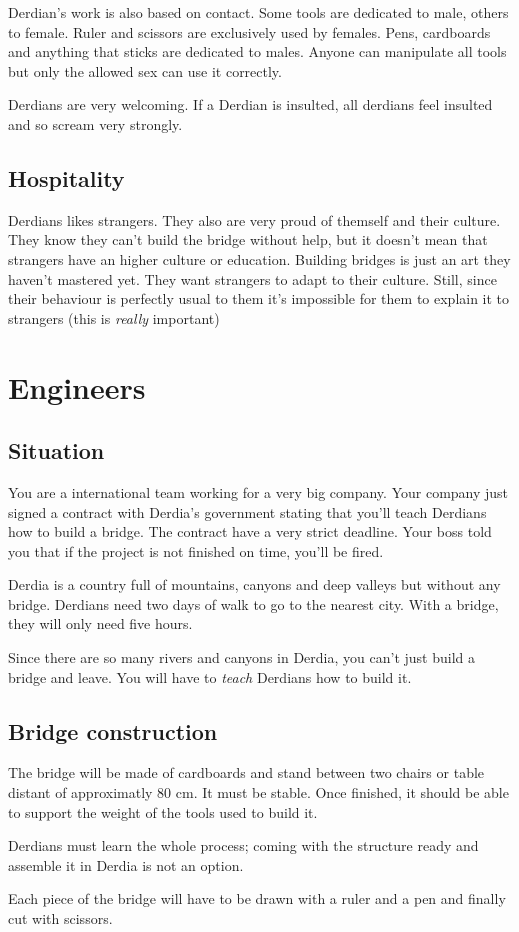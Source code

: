 \documentclass[11pt,a4paper]{article}
\newcounter{derdians}
\begin{document}
{Derdian's work is also based on contact.
Some tools are dedicated to male, others to female.
Ruler and scissors are exclusively used by females. Pens, cardboards and anything that sticks are dedicated to males.
Anyone can manipulate all tools but only the allowed sex can use it correctly.

Derdians are very welcoming. If a Derdian is insulted, all derdians feel insulted and so scream very strongly.
 
\subsection{Hospitality}
 
Derdians likes strangers.
They also are very proud of themself and their culture.
They know they can't build the bridge without help, but it doesn't mean that strangers have an higher culture or education.
Building bridges is just an art they haven't mastered yet.
They want strangers to adapt to their culture.
Still, since their behaviour is perfectly usual to them it's impossible for them to explain it to strangers (this is \emph{really} important)

\pagebreak

}

\section{Engineers}

\subsection{Situation}

You are a international team working for a very big company.
Your company just signed a contract with Derdia's government stating that you'll teach Derdians how to build a bridge.
The contract have a very strict deadline. Your boss told you that if the project is not finished on time, you'll be fired.

Derdia is a country full of mountains, canyons and deep valleys but without any bridge.
Derdians need two days of walk to go to the nearest city.
With a bridge, they will only need five hours.

Since there are so many rivers and canyons in Derdia, you can't just build a bridge and leave.
You will have to \emph{teach} Derdians how to build it.

\subsection{Bridge construction}

The bridge will be made of cardboards and stand between two chairs or table distant of approximatly 80 cm.
It must be stable. Once finished, it should be able to support the weight of the tools used to build it.

Derdians must learn the whole process; coming with the structure ready and assemble it in Derdia is not an option.

Each piece of the bridge will have to be drawn with a ruler and a pen and finally cut with scissors.
\end{document}
